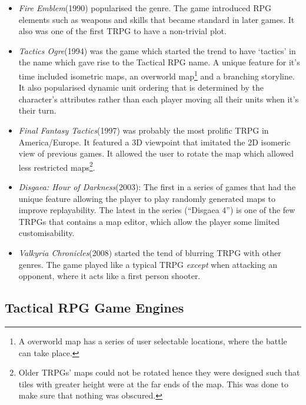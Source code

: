 \begin{itemize}
	
	\item \emph{Fire Emblem}(1990) popularised the genre. The game introduced RPG elements such as weapons and skills that became standard in later games. It also was one of the first TRPG to have a non-trivial plot. 

	\item \emph{Tactics Ogre}(1994) was the game which started the trend to have `tactics' in the name  which gave rise to the Tactical RPG name\footnotemark[\value{footnote}]\cite{tactics}. A unique feature for it's time included isometric maps, an overworld map\footnote{A overworld map has a series of user selectable locations, where the battle can take place.} and  a branching storyline. It also popularised dynamic unit ordering that is determined by the character's attributes rather than each player moving all their units when it's their turn.

	\item \emph{Final Fantasy Tactics}(1997) was probably the most prolific TRPG in America/Europe. It featured a 3D viewpoint that imitated  the 2D isomeric view of previous games.  It allowed the user to rotate the map which allowed less restricted maps\footnote{Older TRPGs' maps could not be rotated hence they were designed such that tiles with greater height were at the far ends of the map. This was done to make sure that nothing was obscured.}.
	
	\item  \emph{Disgaea: Hour of Darkness}(2003): The first in a series of games that had the unique feature allowing the player to play randomly generated maps to improve replayability. The latest in the series (``Disgaea 4'') is one of the few TRPGs that contains a map editor, which allow the player some limited customisability. 


	\item  \emph{Valkyria Chronicles}(2008) started the tend of blurring TRPG with other genres. The game played like a typical TRPG \emph{except} when attacking an opponent, where it acts like a first person shooter.

\end{itemize}

\subsection{Tactical RPG Game Engines}
\label{sub:tactical_rpg_game_engines}

